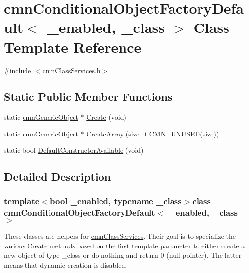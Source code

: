\hypertarget{classcmn_conditional_object_factory_default}{\section{cmn\-Conditional\-Object\-Factory\-Default$<$ \-\_\-enabled, \-\_\-class $>$ Class Template Reference}
\label{classcmn_conditional_object_factory_default}
}


{\ttfamily \#include $<$cmn\-Class\-Services.\-h$>$}

\subsection*{Static Public Member Functions}
\begin{DoxyCompactItemize}
\item 
static \hyperlink{classcmn_generic_object}{cmn\-Generic\-Object} $\ast$ \hyperlink{classcmn_conditional_object_factory_default_ad0da5547777e23f77fb6a983ef003b2a}{Create} (void)
\item 
static \hyperlink{classcmn_generic_object}{cmn\-Generic\-Object} $\ast$ \hyperlink{classcmn_conditional_object_factory_default_aa67042b33210826aa74c16d986890980}{Create\-Array} (size\-\_\-t \hyperlink{cmn_portability_8h_a021894e2626935fa2305434b1e893ff6}{C\-M\-N\-\_\-\-U\-N\-U\-S\-E\-D}(size))
\item 
static bool \hyperlink{classcmn_conditional_object_factory_default_a4a93d590358aa5fb80a11209ed2e24d3}{Default\-Constructor\-Available} (void)
\end{DoxyCompactItemize}


\subsection{Detailed Description}
\subsubsection*{template$<$bool \-\_\-enabled, typename \-\_\-class$>$class cmn\-Conditional\-Object\-Factory\-Default$<$ \-\_\-enabled, \-\_\-class $>$}

These classes are helpers for \hyperlink{classcmn_class_services}{cmn\-Class\-Services}. Their goal is to specialize the various Create methods based on the first template parameter to either create a new object of type \-\_\-class or do nothing and return 0 (null pointer). The latter means that dynamic creation is disabled.

